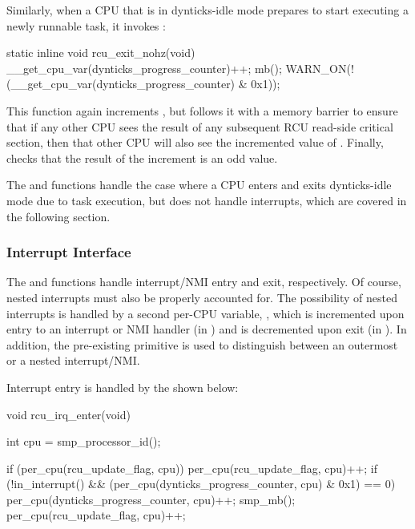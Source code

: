 Similarly, when a CPU that is in dynticks-idle mode prepares to
start executing a newly runnable task, it invokes
:

\begin{VerbatimN}
static inline void rcu_exit_nohz(void)
{
	__get_cpu_var(dynticks_progress_counter)++;
	mb();
	WARN_ON(!(__get_cpu_var(dynticks_progress_counter) &
	          0x1));
}
\end{VerbatimN}

This function again increments ,
but follows it with a memory barrier to ensure that if any other CPU
sees the result of any subsequent RCU read-side critical section,
then that other CPU will also see the incremented value of
.
Finally,  checks that the result of the
increment is an odd value.

The  and 
functions handle the case where a CPU enters and exits dynticks-idle
mode due to task execution, but does not handle interrupts, which are
covered in the following section.

\subsubsection{Interrupt Interface}
\label{sec:formal:Interrupt Interface}

The  and 
functions handle interrupt/NMI entry and exit, respectively.
Of course, nested interrupts must also be properly accounted for.
The possibility of nested interrupts is handled by a second per-CPU
variable, , which is incremented upon
entry to an interrupt or NMI handler (in )
and is decremented upon exit (in ).
In addition, the pre-existing  primitive is
used to distinguish between an outermost or a nested interrupt/NMI.

Interrupt entry is handled by the 
shown below:

\begin{fcvlabel}
\begin{VerbatimN}[commandchars=\\\[\]]
void rcu_irq_enter(void)
{
	int cpu = smp_processor_id();	\lnlbl[fetch]

	if (per_cpu(rcu_update_flag, cpu))	\lnlbl[inc:b]
		per_cpu(rcu_update_flag, cpu)++; \lnlbl[inc:e]
	if (!in_interrupt() &&			\lnlbl[chk_lv:b]
	    (per_cpu(dynticks_progress_counter,
	             cpu) & 0x1) == 0) {	\lnlbl[chk_lv:e]
		per_cpu(dynticks_progress_counter, cpu)++; 
		smp_mb();			\lnlbl[mb]
		per_cpu(rcu_update_flag, cpu)++;
	}
}
\end{VerbatimN}
\end{fcvlabel}

